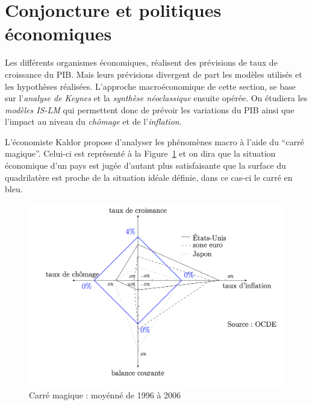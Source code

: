 \section{Conjoncture et politiques économiques} %
\label{prt:conjoncture_et_politiques_economiques}

Les différents organismes économiques, réalisent des prévisions de taux de croissance du PIB. Mais leurs prévisions divergent de part les modèles utilisés et 
les hypothèses réalisées.
L'approche macroéconomique de cette section, se base sur l'\emph{analyse de Keynes} 
et la \emph{synthèse néoclassique} ensuite opérée. 
On étudiera les \emph{modèles IS-LM} qui permettent donc de prévoir
les variations du PIB ainsi que l'impact au niveau du \emph{chômage} et de l'\emph{inflation}. 

L'économiste Kaldor propose d'analyser les phénomènes macro à l'aide du ``carré magique''.
Celui-ci est représenté à la Figure~\ref{fig:carre_magique} et on dira que la situation
économique d'un pays est jugée d'autant plus satisfaisante que la surface du quadrilatère
est proche de la situation idéale définie, dans ce cas-ci le carré en bleu.

\begin{figure}[h]
	\begin{center}
		\includegraphics[scale=0.5]{./img/im2}
	\end{center}
	\caption{Carré magique : moyénné de 1996 à 2006}
  \label{fig:carre_magique}
\end{figure}

